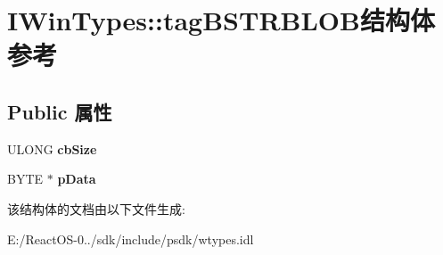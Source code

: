 \hypertarget{struct_i_win_types_1_1tag_b_s_t_r_b_l_o_b}{}\section{I\+Win\+Types\+:\+:tag\+B\+S\+T\+R\+B\+L\+O\+B结构体 参考}
\label{struct_i_win_types_1_1tag_b_s_t_r_b_l_o_b}
\subsection*{Public 属性}
\begin{DoxyCompactItemize}
\item 
\mbox{\label{struct_i_win_types_1_1tag_b_s_t_r_b_l_o_b_a5d35ec6af82e7fc6866b0483af996188}} 
U\+L\+O\+NG {\bfseries cb\+Size}
\item 
\mbox{\label{struct_i_win_types_1_1tag_b_s_t_r_b_l_o_b_a9632789b75dfb7927df8e0d385258718}} 
B\+Y\+TE $\ast$ {\bfseries p\+Data}
\end{DoxyCompactItemize}


该结构体的文档由以下文件生成\+:\begin{DoxyCompactItemize}
\item 
E\+:/\+React\+O\+S-\/0../sdk/include/psdk/wtypes.\+idl\end{DoxyCompactItemize}
